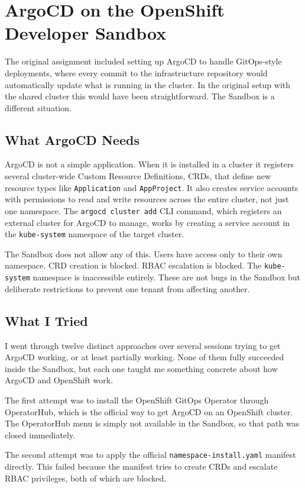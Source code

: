 \section{ArgoCD on the OpenShift Developer Sandbox}

The original assignment included setting up ArgoCD to handle GitOps-style deployments,
where every commit to the infrastructure repository would automatically update what is
running in the cluster. In the original setup with the shared cluster this would have
been straightforward. The Sandbox is a different situation.

\subsection{What ArgoCD Needs}

ArgoCD is not a simple application. When it is installed in a cluster it registers
several cluster-wide Custom Resource Definitions, CRDs, that define new resource types
like \texttt{Application} and \texttt{AppProject}. It also creates service accounts with
permissions to read and write resources across the entire cluster, not just one namespace.
The \texttt{argocd cluster add} CLI command, which registers an external cluster for
ArgoCD to manage, works by creating a service account in the \texttt{kube-system}
namespace of the target cluster.

The Sandbox does not allow any of this. Users have access only to their own namespace.
CRD creation is blocked. RBAC escalation is blocked. The \texttt{kube-system} namespace
is inaccessible entirely. These are not bugs in the Sandbox but deliberate restrictions
to prevent one tenant from affecting another.

\subsection{What I Tried}

I went through twelve distinct approaches over several sessions trying to get ArgoCD
working, or at least partially working. None of them fully succeeded inside the Sandbox,
but each one taught me something concrete about how ArgoCD and OpenShift work.

The first attempt was to install the OpenShift GitOps Operator through OperatorHub,
which is the official way to get ArgoCD on an OpenShift cluster. The OperatorHub menu
is simply not available in the Sandbox, so that path was closed immediately.

The second attempt was to apply the official \texttt{namespace-install.yaml} manifest
directly. This failed because the manifest tries to create CRDs and escalate RBAC
privileges, both of which are blocked.

